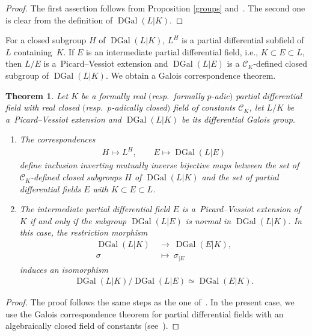 \documentclass[pdftex]{sigma}%
\numberwithin{equation}{section}
\newtheorem{Theorem}{Theorem}[section]
\def \DGal{\operatorname{DGal}}
\begin{document}
\begin{proof} The first assertion follows from Proposition \ref{groups} and~\cite[Proposition~1]{CHSA}. The second one is clear from the definition of $\DGal(L|K)$.
\end{proof}

For a closed subgroup $H$ of $\DGal(L|K)$, $L^H$ is a partial
differential subfield of $L$ containing~$K$. If $E$ is an
intermediate partial differential field, i.e., $K\subset E \subset
L$, then $L/E$ is a~Picard--Vessiot extension and $\DGal(L|E)$
is a $\mathcal{C}_K$-defined closed subgroup of $\DGal(L|K)$. We obtain a Galois correspondence theorem.

\begin{Theorem} Let $K$ be a formally real $($resp.\ formally $p$-adic$)$ partial differential field with real closed $($resp.\ $p$-adically closed$)$ field of constants $\mathcal{C}_K$, let $L/K$ be a~Picard--Vessiot extension and $\DGal(L|K)$ be its differential Galois group.
\begin{enumerate}\itemsep=0pt
\item[$1.$]
The correspondences
\begin{gather*}
H\mapsto L^H , \qquad E\mapsto \DGal(L|E)
\end{gather*}
define inclusion inverting mutually inverse bijective
maps between the set of $\mathcal{C}_K$-defined closed subgroups $H$ of $\DGal(L|K)$
and the set of partial differential fields $E$ with \mbox{$K\!\subset\! E \!\subset\!
L$}.

\item[$2.$] The intermediate partial differential field $E$ is a~Picard--Vessiot extension of $K$ if and only if the subgroup $\DGal(L|E)$ is normal in $\DGal(L|K)$. In this case, the restriction morphism
\begin{align*}
\DGal(L|K)&\ \rightarrow\ \DGal(E|K),
\\
\sigma &\ \mapsto \ \sigma_{|E}
\end{align*}
induces an isomorphism
\begin{gather*}
\DGal(L|K)/\DGal(L|E) \simeq \DGal(E|K).
\end{gather*}
\end{enumerate}
\end{Theorem}

\begin{proof}
The proof follows the same steps as the one of~\cite[Theorem~1]{CHSA}. In the present case, we use the Galois correspondence theorem for partial differential fields with an algebraically closed field of constants (see~\cite[Appendix~D]{PS}).
\end{proof}
\end{document}
